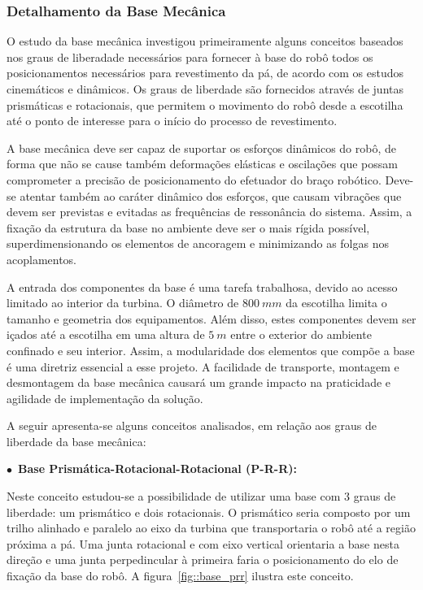 \subsubsection{Detalhamento da Base Mecânica}\label{sec::base_mec}
O estudo da base mecânica investigou primeiramente alguns conceitos baseados nos
graus de liberadade necessários para fornecer à base do robô todos os
posicionamentos necessários para revestimento  da pá, de acordo com os
estudos cinemáticos e dinâmicos. Os graus de liberdade são fornecidos através de
juntas prismáticas e rotacionais, que permitem o movimento do robô desde a
escotilha até o ponto de interesse para o início do processo de revestimento.

A base mecânica deve ser capaz de suportar os esforços dinâmicos do robô, de
forma que não se cause também deformações elásticas e oscilações que possam
comprometer a precisão de posicionamento do efetuador do braço robótico. Deve-se
atentar também ao caráter dinâmico dos esforços, que causam vibrações que devem
ser previstas e evitadas as frequências de ressonância do sistema. Assim, a
fixação da estrutura da base no ambiente deve ser o mais rígida possível,
superdimensionando os elementos de ancoragem e minimizando as folgas nos
acoplamentos.

A entrada dos componentes da base é uma tarefa trabalhosa, devido ao acesso
limitado ao interior da turbina. O diâmetro de $800~mm$ da escotilha limita o
tamanho e geometria dos equipamentos. Além disso, estes componentes devem ser
içados até a escotilha em uma altura de $5~m$ entre o exterior do ambiente
confinado e seu interior. Assim, a modularidade dos elementos que compõe a base
é uma diretriz essencial a esse projeto. A facilidade de transporte, montagem e
desmontagem da base mecânica causará um grande impacto na praticidade e
agilidade de implementação da solução.

A seguir apresenta-se alguns conceitos analisados, em relação aos graus de
liberdade da base mecânica:

$\bullet$~\textbf{Base Prismática-Rotacional-Rotacional (P-R-R):}
  
  Neste conceito estudou-se a possibilidade de utilizar uma base com $3$ graus
  de liberdade: um prismático e dois rotacionais. O prismático seria composto
  por um trilho alinhado e paralelo ao eixo da turbina que transportaria o robô
  até a região próxima a pá. Uma junta rotacional e com eixo vertical orientaria
  a base nesta direção e uma junta perpedincular à primeira faria o
  posicionamento do elo de fixação da base do robô. A figura~\ref{fig::base_prr}
  ilustra este conceito.
    

